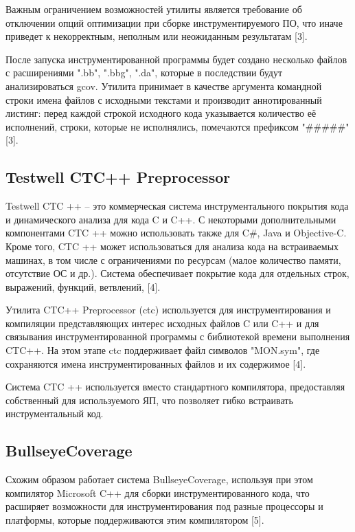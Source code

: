 Важным ограничением возможностей утилиты является требование об отключении опций оптимизации при сборке инструментируемого ПО, что иначе приведет к некорректным, неполным или неожиданным результатам [3].

После запуска инструментированной программы будет создано несколько файлов с расширениями ".bb", ".bbg", ".da", которые в последствии будут анализироваться gcov. Утилита принимает в качестве аргумента командной строки имена файлов с исходными текстами и производит аннотированный листинг: перед каждой строкой исходного кода указывается количество её исполнений, строки, которые не исполнялись, помечаются префиксом "\#\#\#\#\#" [3].

\subsection{Testwell CTC++ Preprocessor}
Testwell CTC ++ -- это коммерческая система инструментального покрытия кода и динамического анализа для кода C и C++. С некоторыми дополнительными компонентами CTC ++ можно использовать также для C\#, Java и Objective-C. Кроме того, CTC ++ может использоваться для анализа кода на встраиваемых машинах, в том числе с ограничениями по ресурсам (малое количество памяти, отсутствие ОС и др.). Система обеспечивает покрытие кода для отдельных строк, выражений, функций, ветвлений, [4].

Утилита CTC++ Preprocessor (ctc) используется для инструментирования и компиляции представляющих интерес исходных файлов C или C++ и для связывания инструментированной программы с библиотекой времени выполнения CTC++. На этом этапе ctc поддерживает файл символов "MON.sym", где сохраняются имена инструментированных файлов и их содержимое [4].

Система CTC ++ используется вместо стандартного компилятора, предоставляя собственный для используемого ЯП, что позволяет гибко встраивать инструментальный код.

\subsection{BullseyeCoverage}
Схожим образом работает система BullseyeCoverage, используя при этом компилятор Microsoft C++ для сборки инструментированного кода, что расширяет возможности для инструментирования под разные процессоры и платформы, которые поддерживаются этим компилятором [5].


